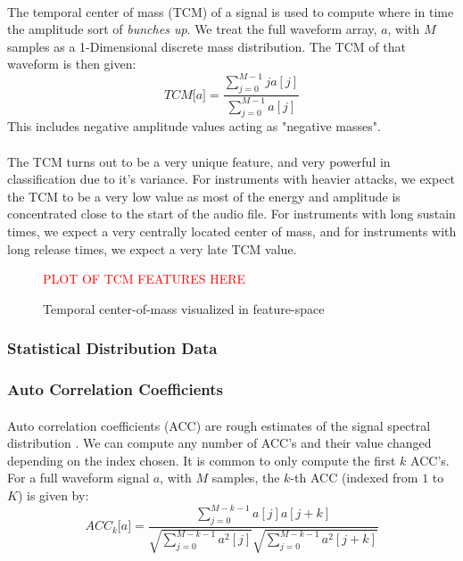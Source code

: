 \documentclass[12pt,letterpaper]{article}
\begin{document}
\paragraph*{}The temporal center of mass (TCM) of a signal is used to compute where in time the amplitude sort of \textit{bunches up}. We treat the full waveform array, $a$, with $M$ samples as a 1-Dimensional discrete mass distribution. The TCM of that waveform is then given:
\begin{equation}
\label{eqn-FeatureTCM}
TCM\big[ a \big] = \frac{\sum_{j=0}^{M-1}j a[j]}{\sum_{j=0}^{M-1}a[j]}
\end{equation}
This includes negative amplitude values acting as "negative masses".

\paragraph*{}The TCM turns out to be a very unique feature, and very powerful in classification due to it's variance. For instruments with heavier attacks, we expect the TCM to be a very low value as most of the energy and amplitude is concentrated close to the start of the audio file. For instruments with long sustain times, we expect a very centrally located center of mass, and for instruments with long release times, we expect a very late TCM value.

\begin{figure}[H]
\label{fig-FeatureTCM}
\begin{center}
\textcolor{red}{PLOT OF TCM FEATURES HERE}
\end{center}
\caption{Temporal center-of-mass visualized in feature-space}
\end{figure}

\subsubsection{Statistical Distribution Data}

\subsubsection{Auto Correlation Coefficients}

\paragraph*{}Auto correlation coefficients (ACC) are rough estimates of the signal spectral distribution \cite{Virtanen}. We can compute any number of ACC's and their value changed depending on the index chosen. It is common to only compute the first $k$ ACC's. For a full waveform signal $a$, with $M$ samples, the $k$-th ACC (indexed from $1$ to $K$) is given by:
\begin{equation}
\label{eqn-FeatureACC}
ACC_k\big[ a \big] = \frac{\sum_{j=0}^{M-k-1}a[j]a[j+k]} {\sqrt{\sum_{j=0}^{M-k-1}a^2[j]} \sqrt{\sum_{j=0}^{M-k-1}a^2[j+k]}}
\end{equation}
\end{document}

